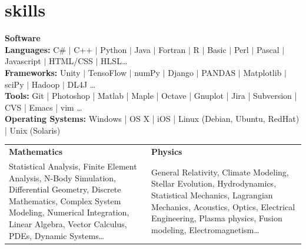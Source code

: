 \documentclass[]{seiler-resume}
\begin{document}
\section{skills}
\textbf{\large Software}\\
\textbf{Languages:} C\# $\vert$ C++ $\vert$ Python $\vert$ Java $\vert$ Fortran $\vert$ R $\vert$ Basic $\vert$ Perl $\vert$ Pascal $\vert$ Javascript  $\vert$ HTML/CSS $\vert$ HLSL\ldots\\
\textbf{Frameworks:} Unity $\vert$ TensoFlow $\vert$ numPy $\vert$ Django $\vert$ PANDAS $\vert$ Matplotlib $\vert$ sciPy $\vert$ Hadoop $\vert$ DL4J \ldots \\
\textbf{Tools:} Git | Photoshop | Matlab | Maple | Octave | Gnuplot | Jira | Subversion | CVS | Emacs | vim \ldots \\
\textbf{Operating Systems:} Windows  | OS X | iOS | Linux (Debian, Ubuntu, RedHat) | Unix (Solaris)\\[1em]
\begin{tabular*}{\textwidth}{@{\extracolsep{\fill}}ll}
\textbf{\large Mathematics} & \textbf{\large Physics}\\
\parbox[t]{6.6cm}{Statistical Analysis, Finite Element Analysis, N-Body Simulation, Differential Geometry, Discrete Mathematics, Complex System Modeling,
Numerical Integration, Linear Algebra, Vector Calculus, PDEs,  
Dynamic Systems\ldots}& \parbox[t]{7cm}{General Relativity, Climate Modeling, Stellar Evolution, Hydrodynamics, Statistical Mechanics, Lagrangian Mechanics, Acoustics, Optics, Electrical Engineering, Plasma physics, Fusion modeling, Electromagnetism\ldots}
  \end{tabular*}
  
\pagebreak
\end{document}
